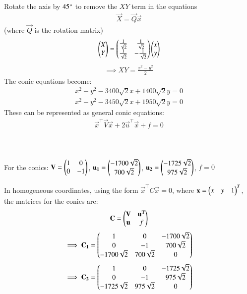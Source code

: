 \documentclass[journal]{IEEEtran}
\begin{document}
Rotate the axis by $45\degree$ to remove the $XY$ term in the equations
\begin{align}
\vec{X} = \vec{Q}\vec{x} 
\end{align}
(where $\vec{Q}$ is the rotation matrix)
\begin{align}
\begin{pmatrix}X \\ Y\end{pmatrix} = \begin{pmatrix}\frac{1}{\sqrt{2}} & \frac{1}{\sqrt{2}} \\ \frac{1}{\sqrt{2}} & -\frac{1}{\sqrt{2}}\end{pmatrix}\begin{pmatrix}x \\ y\end{pmatrix} \label{eq:3}
\end{align}
\begin{align}
\implies XY = \frac{x^2 - y^2}{2}
\end{align}
The conic equations become:
\begin{align}
x^2 - y^2 -3400\sqrt{2}x + 1400\sqrt{2}y = 0
\end{align}
\begin{align}
x^2 - y^2 - 3450\sqrt{2}x + 1950\sqrt{2}y = 0
\end{align}
These can be represented as general conic equations:
\begin{align}
\vec{x}^\top\vec{V}\vec{x} + 2\vec{u}^\top\vec{x} + f = 0
\end{align}\\ \\ \\ 
For the conics: $\mathbf{V} = \begin{pmatrix}1 & 0 \\ 0 & -1\end{pmatrix}$, $\mathbf{u_1} = \begin{pmatrix}-1700\sqrt{2} \\ 700\sqrt{2}\end{pmatrix}$, $\mathbf{u_2} = \begin{pmatrix}-1725\sqrt{2} \\ 975\sqrt{2}\end{pmatrix}$, $f=0$

In homogeneous coordinates, using the form $\vec{x}^\top C \vec{x} = 0$, where $\mathbf{x} = \begin{pmatrix}x & y & 1\end{pmatrix}^T$, the matrices for the conics are:\\
\begin{align}
\mathbf{C} = \begin{pmatrix}\mathbf{V} & \mathbf{u^T} \\ \mathbf{u} & f\end{pmatrix}
\end{align}
\begin{align}
\implies \mathbf{C_1} = \begin{pmatrix}1 & 0 & -1700\sqrt{2} \\ 0 & -1 & 700\sqrt{2} \\ -1700\sqrt{2} & 700\sqrt{2} & 0\end{pmatrix}
\end{align}
\begin{align}
\implies \mathbf{C_2} = \begin{pmatrix}1 & 0 & -1725\sqrt{2} \\ 0 & -1 & 975\sqrt{2} \\ -1725\sqrt{2} & 975\sqrt{2} & 0\end{pmatrix}
\end{align}\\
\end{document}
